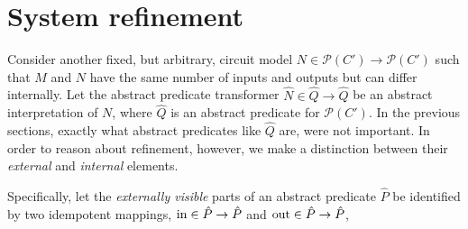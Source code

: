 \section{System refinement}


Consider another fixed, but arbitrary, circuit model $N \in \mathcal{P}(C') \rightarrow \mathcal{P}(C')$ such that $M$ and $N$ have the same number of inputs and outputs but can differ internally. Let the abstract predicate transformer $\hat N \in \hat Q \rightarrow \hat Q$ be an abstract interpretation of $N$, where $\hat Q$ is an abstract predicate for $\mathcal{P}(C')$. In the previous sections, exactly what abstract predicates like $\hat Q$ are, were not important. In order to reason about refinement, however, we  make a distinction between their \textit{external} and \textit{internal} elements.

Specifically, let the \textit{externally visible} parts of an abstract predicate $\hat P$ be identified by two idempotent mappings, $\operatorname{in} \in \hat P \rightarrow \hat P$ and $\operatorname{out} \in \hat P \rightarrow \hat P$, 





